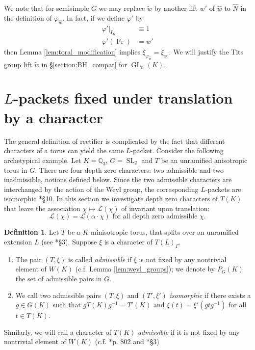 \documentclass{compositio}
\theoremstyle{plain}
\theoremstyle{definition}
\newtheorem{definition}[theorem]{Definition}
\numberwithin{equation}{section}
\DeclareMathOperator{\Fr}{Fr}
\DeclareMathOperator{\GL}{GL}
\DeclareMathOperator{\SL}{SL}
\newcommand{\QQ}{\mathbb{Q}}
\newcommand{\Lpack}{\mathcal{L}}
\begin{document}
We note that for semisimple $G$ we may replace $\tilde{w}$ by another
lift $w'$ of $\hat{w}$ to $\hat{N}$ in the definition of $\varphi_{\hat{w}}$.
In fact, if we define $\varphi'$ by
\begin{align*}
\varphi'|_{I_K} &\equiv 1 \\
\varphi'(\Fr) &= w'
\end{align*}
then Lemma \ref{lem:toral_modification} implies $\xi_{\varphi_{\hat{w}}} = \xi_{\varphi'}$.
We will justify the Tits group lift $\tilde{w}$ in \S\ref{section:BH_compat} for $\GL_n(K)$.

\section{$L$-packets fixed under translation by a character}\label{Q_T}

The general definition of rectifier is complicated by the fact that different
characters of a torus can yield the same $L$-packet.  Consider the following archetypical example.
Let $K = \QQ_3$, $G = \SL_2$ and $T$ be an unramified anisotropic torus in $G$.  There are four depth zero
characters: two admissible and two inadmissible, notions defined below.  Since the two admissible characters are interchanged
by the action of the Weyl group, the corresponding $L$-packets are isomorphic \cite{murnaghan:11}*{\S10}.
In this section we investigate depth zero characters of $T(K)$ that leave the association
$\chi \mapsto \Lpack(\chi)$ of \cite{reeder-debacker:09a} invariant upon translation:
$$\Lpack(\chi) = \Lpack(\alpha\cdot\chi) \mbox{ for all depth zero admissible $\chi$}.$$

\begin{definition} \label{def:admissible}
Let $T$ be a $K$-minisotropic torus, that splits over an unramified
extension $L$ (see \cite{reeder:08a}*{\S3}).  Suppose $\xi$ is a character of $T(L)_{\Gamma}$.
\begin{enumerate}
\item The pair $(T, \xi)$ is called \emph{admissible} if $\xi$ is not fixed
by any nontrivial element of $W(K)$ (c.f. Lemma \ref{lem:weyl_groups}); we
denote by $P_G(K)$ the set of admissible pairs in $G$.
\item We call two admissible pairs $(T, \xi)$ and $(T', \xi')$ \emph{isomorphic} if there
exists a $g \in G(K)$ such that $gT(K)g^{-1} = T'(K)$ and $\xi(t) = \xi'(gtg^{-1})$
for all $t \in T(K)$.
\end{enumerate}
Similarly, we will call a character of $T(K)$ \emph{admissible} if
it is not fixed by any nontrivial element of $W(K)$
(c.f. \cite{reeder-debacker:09a}*{p. 802} and \cite{reeder:08a}*{\S3})
\end{definition}
\end{document}
